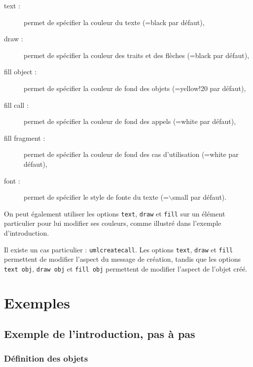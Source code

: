 \documentclass[a4paper,11pt]{report}
\newcommand{\inputTikZ}[1]{%
  }%
\newcommand{\inputTikZ}[1]{%
    \texttt{[image: fig/\#1.pdf]}%
  }%
\begin{document}
\begin{description}
\item[text :] permet de spécifier la couleur du texte (=black par défaut),
\item[draw :] permet de spécifier la couleur des traits et des flèches (=black par défaut),
\item[fill object :] permet de spécifier la couleur de fond des objets (=yellow!20 par défaut),
\item[fill call :] permet de spécifier la couleur de fond des appels (=white par défaut),
\item[fill fragment :] permet de spécifier la couleur de fond des cas d'utilisation (=white par défaut),
\item[font :] permet de spécifier le style de fonte du texte (=$\backslash$small par défaut).
\end{description}

On peut également utiliser les options {\tt text}, {\tt draw} et {\tt fill} sur un élément particulier pour lui modifier ses couleurs, comme illustré dans l'exemple d'introduction. 

Il existe un cas particulier : {\tt umlcreatecall}. Les options {\tt text}, {\tt draw} et {\tt fill} permettent de modifier l'aspect du message de création, tandis que les options {\tt text obj}, {\tt draw obj} et {\tt fill obj} permettent de modifier l'aspect de l'objet créé.

\medskip

\begin{minipage}{0.6\textwidth}

\end{minipage}
\begin{minipage}{0.4\textwidth}
\begin{center}
\inputTikZ{createcallset}
\end{center}
\end{minipage}

\section{Exemples}

\subsection{Exemple de l'introduction, pas à pas}

\subsubsection{Définition des objets}
\end{document}
